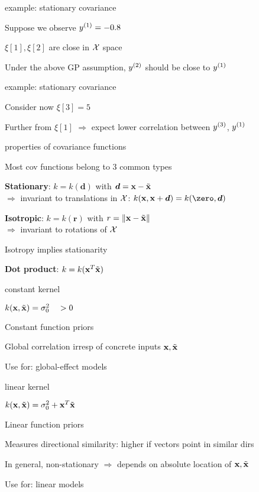 \documentclass[11pt,compress,t,notes=noshow, xcolor=table]{beamer}
\begin{document}
\begin{framei}{example: stationary covariance}
\item Suppose we observe $\yi[1] = -0.8$
\item $\xi[1], \xi[2]$ are close in $\Xspace$ space
\item Under the above GP assumption, $\yi[2]$ should be close to $\yi[1]$ 
\vfill
{}
\end{framei}

\begin{framei}{example: stationary covariance}
\item Consider now $\xi[3] = 5$
\item Further from $\xi[1]$ $\Rightarrow$ expect lower correlation between $\yi[3]$, $\yi[1]$ 
\vfill
{}
\end{framei}

\begin{framei}[sep=L]{properties of covariance functions}
\item Most cov functions belong to 3 common types
\item \textbf{Stationary}: $k = k(\bm{d})$ with $\bm{d} = \xv - \tilde{\xv}$ \\
$\Rightarrow$ invariant to translations in $\Xspace$: $k(\xv, \xv + \bm{d}) = k(\zero, \bm{d})$
\item \textbf{Isotropic}: $k = k(\bm{r})$ with $r = \| \xv - \tilde{\xv} \|$ \\
$\Rightarrow$ invariant to rotations of $\Xspace$
\item Isotropy implies stationarity
\item \textbf{Dot product}: $k = k(\xv^T \tilde{\xv})$
\end{framei}

\begin{framei}{constant kernel}
\item $k(\xv, \tilde{\xv}) = \sigma^2_0 \quad > 0$
\item Constant function priors
\item Global correlation irresp of concrete inputs $\xv, \tilde{\xv}$
\item Use for: global-effect models
\end{framei}

\begin{framei}{linear kernel}
\item $k(\xv, \tilde{\xv}) = \sigma^2_0 + \xv^T \tilde{\xv}$
\item Linear function priors
\item Measures directional similarity: higher if vectors point in similar dirs
\item In general, non-stationary $\Rightarrow$ depends on absolute location of $\xv, \tilde{\xv}$
\item Use for: linear models
\end{framei}
\end{document}
